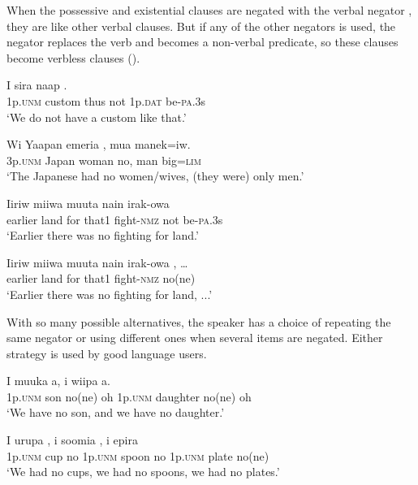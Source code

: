 When the possessive and existential clauses are negated with the verbal negator , they are like other verbal clauses. But if any of the other negators is used, the negator replaces the verb and becomes a non-verbal predicate, so these clauses become verbless clauses ().

\ea%
\label{ex:6:x1098}
\gll I  sira  naap      . \\
1p.\textsc{unm}  custom  thus  not  1p.\textsc{dat}  be-\textsc{pa}.3s\\
\glt `We do not have a custom like that.'
\z

\ea%
\label{ex:6:x1094}
\gll Wi  Yaapan  emeria  ,  mua  manek=iw. \\
3p.\textsc{unm}  Japan  woman  no,  man  big=\textsc{lim}\\
\glt `The Japanese had no women/wives, (they were) only men.'
\z

\ea%
\label{ex:6:x1099}
\gll Iiriw  miiwa  muuta  nain  irak-owa     \\
earlier  land  for  that1  fight-\textsc{nmz}  not  be-\textsc{pa}.3s\\
\glt `Earlier there was no fighting for land.'
\z

\ea%
\label{ex:6:x1100}
\gll Iiriw  miiwa  muuta  nain  irak-owa  , {\dots} \\
earlier  land  for  that1  fight-\textsc{nmz}  no(ne)\\
\glt `Earlier there was no fighting for land, ...'
\z

With so many possible alternatives, the speaker has a choice of repeating the same negator or using different ones when several items are negated. Either strategy is used by good language users.

\ea%
\label{ex:6:x1128}
\gll I  muuka    a,  i  wiipa    a. \\
1p.\textsc{unm}  son  no(ne)  oh  1p.\textsc{unm}  daughter  no(ne)  oh\\
\glt `We have no son, and we have no daughter.'
\z

\ea%
\label{ex:6:x1127}
\gll I  urupa  ,  i  soomia  ,  i epira  \\
1p.\textsc{unm}  cup  no  1p.\textsc{unm}  spoon  no  1p.\textsc{unm} plate  no(ne)\\
\glt `We had no cups, we had no spoons, we had no plates.'
\z

